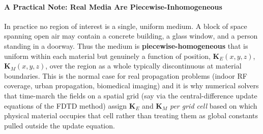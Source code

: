 \paragraph{A Practical Note: Real Media Are Piecewise-Inhomogeneous}
In practice no region of interest is a single, uniform medium. A block of
space spanning open air may contain a concrete building, a glass window,
and a person standing in a doorway. Thus the medium  is \textbf{piecewise-homogeneous}
that is uniform within each material but genuinely a function of position,
\( \mathbf{K}_E(x,y,z) \), \( \mathbf{K}_M(x,y,z) \), over the
region as a whole typically discontinuous at material boundaries. This is
the normal case for real propagation problems (indoor RF coverage, urban
propagation, biomedical imaging) and it is why numerical solvers that time-march
the fields on a spatial grid (say via the central-difference update
equations of the FDTD method) assign \( \mathbf{K}_E \) and
\( \mathbf{K}_M \) \emph{per grid cell} based on which physical material
occupies that cell rather than treating them as global constants pulled outside the
update equation.
